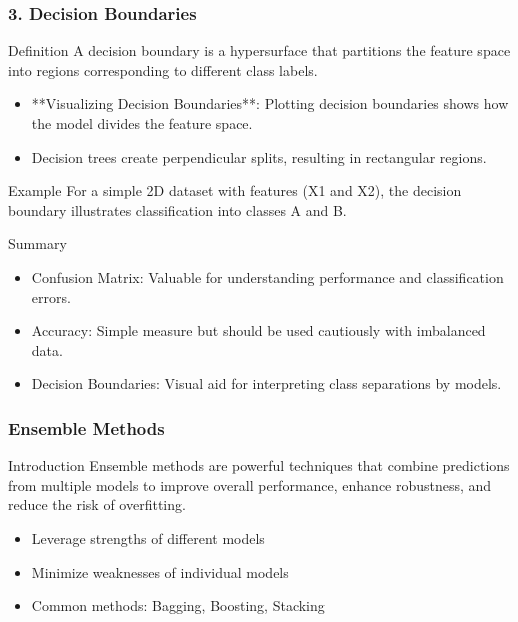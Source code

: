 \documentclass[aspectratio=169]{beamer}
\begin{document}
\begin{frame}[fragile]
    \frametitle{3. Decision Boundaries}
    \begin{block}{Definition}
        A decision boundary is a hypersurface that partitions the feature space into regions corresponding to different class labels.
    \end{block}
    
    \begin{itemize}
        \item **Visualizing Decision Boundaries**: Plotting decision boundaries shows how the model divides the feature space.
        \item Decision trees create perpendicular splits, resulting in rectangular regions.
    \end{itemize}
    
    \begin{block}{Example}
        For a simple 2D dataset with features (X1 and X2), the decision boundary illustrates classification into classes A and B.
    \end{block}
    
    \begin{block}{Summary}
        \begin{itemize}
            \item Confusion Matrix: Valuable for understanding performance and classification errors.
            \item Accuracy: Simple measure but should be used cautiously with imbalanced data.
            \item Decision Boundaries: Visual aid for interpreting class separations by models.
        \end{itemize}
    \end{block}
\end{frame}

\begin{frame}[fragile]
    \frametitle{Ensemble Methods}
    \begin{block}{Introduction}
        Ensemble methods are powerful techniques that combine predictions from multiple models to improve overall performance, enhance robustness, and reduce the risk of overfitting. 
    \end{block}
    \begin{itemize}
        \item Leverage strengths of different models
        \item Minimize weaknesses of individual models
        \item Common methods: Bagging, Boosting, Stacking
    \end{itemize}
\end{frame}
\end{document}

